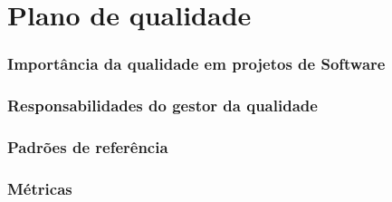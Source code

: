 \chapter{Plano de qualidade}
\label{plano_de_qualidade}

\subsection{Importância da qualidade em projetos de Software}
\subsection{Responsabilidades do gestor da qualidade}
\subsection{Padrões de referência}
\subsection{Métricas}